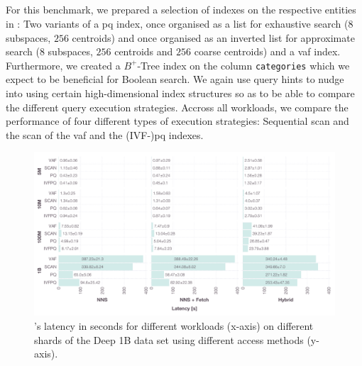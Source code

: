 \subsection{\cottontail}
\label{section:evaluation_bignns_cottontail}
For this benchmark, we prepared a selection of indexes on the respective entities in \cottontail{}: Two variants of a \acrshort{pq} index, once organised as a list for exhaustive search ($8$ subspaces, $256$ centroids) and once organised as an inverted list for approximate search ($8$ subspaces, $256$ centroids and $256$ coarse centroids) and a \acrshort{vaf} index. Furthermore, we created a $B^{+}$-Tree index on the column \texttt{categories} which we expect to be beneficial for Boolean search. We again use query hints to nudge \cottontail{} into using certain high-dimensional index structures so as to be able to compare the different query execution strategies. Accross all workloads, we compare the performance of four different types of execution strategies: Sequential scan and the scan of the \acrshort{vaf} and the (IVF-)\acrshort{pq} indexes.

\begin{landscape}
    \begin{figure}[p]
        \centering
        \includegraphics[width=1.55\textwidth]{figures/bignns/cottontail/bignns-cottontail-runtime}
        \caption {\cottontail{}'s latency in seconds for different workloads (x-axis) on different shards of the Deep 1B data set using different access methods (y-axis).}
        \label{figure:cottontail_runtime}
    \end{figure}
\end{landscape}

